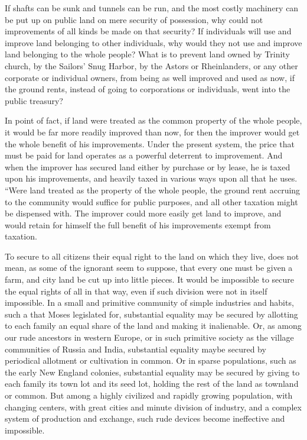 \documentclass{book}
\begin{document}
If shafts can be sunk and tunnels can be run, and the most costly machinery can be put up on public land on mere security of possession, why could not improvements of all kinds be made on that security? If individuals will use and improve land belonging to other individuals, why would they not use and improve land belonging to the whole people? What is to prevent land owned by Trinity church, by the Sailors’ Snug Harbor, by the Astors or Rheinlanders, or any other corporate or individual owners, from being as well improved and used as now, if the ground rents, instead of going to corporations or individuals, went into the public treasury?

In point of fact, if land were treated as the common property of the whole people, it would be far more readily improved than now, for then the improver would get the whole benefit of his improvements. Under the present system, the price that must be paid for land operates as a powerful deterrent to improvement. And when the improver has secured land either by purchase or by lease, he is taxed upon his improvements, and heavily taxed in various ways upon all that he uses. “Were land treated as the property of the whole people, the ground rent accruing to the community would suffice for public purposes, and all other taxation might be dispensed with. The improver could more easily get land to improve, and would retain for himself the full benefit of his improvements exempt from taxation.

To secure to all citizens their equal right to the land on which they live, does not mean, as some of the ignorant seem to suppose, that every one must be given a farm, and city land be cut up into little pieces. It would be impossible to secure the equal rights of all in that way, even if such division were not in itself impossible. In a small and primitive community of simple industries and habits, such a that Moses legislated for, substantial equality may be secured by allotting to each family an equal share of the land and making it inalienable. Or, as among our rude ancestors in western Europe, or in such primitive society as the village communities of Russia and India, substantial equality maybe secured by periodical allotment or cultivation in common. Or in sparse populations, such as the early New England colonies, substantial equality may be secured by giving to each family its town lot and its seed lot, holding the rest of the land as townland or common. But among a highly civilized and rapidly growing population, with changing centers, with great cities and minute division of industry, and a complex system of production and exchange, such rude devices become ineffective and impossible.
\end{document}
